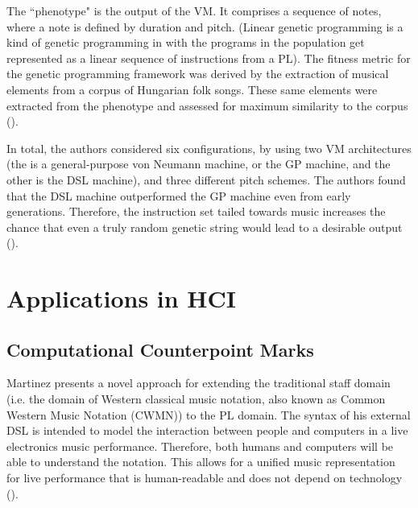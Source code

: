 \documentclass{report}
\newcommand\citeparen[1]{(\cite{#1})}
\begin{document}
The ``phenotype" is the  output of the  VM. It comprises a sequence of  notes,  where a note  is defined by duration and pitch. (Linear genetic programming is a kind of genetic programming in  with the programs in the population get represented  as a linear sequence of instructions from a PL). The fitness metric for the  genetic programming framework was derived  by  the extraction of  musical elements from a corpus of Hungarian folk songs. These same  elements  were extracted from  the  phenotype and  assessed for maximum similarity  to the  corpus \citeparen{sulyok_harte_bodo_2019}.

In total, the authors considered six configurations, by using two VM  architectures (the  is a general-purpose von  Neumann  machine,  or the GP machine,  and the other is  the DSL machine), and  three  different pitch schemes. The authors  found that  the DSL  machine outperformed  the GP machine even from  early generations. Therefore, the instruction set  tailed towards  music increases the  chance  that even a truly random genetic string  would  lead  to a desirable output \citeparen{sulyok_harte_bodo_2019}.

\section{Applications in HCI} 
\label{sec:hci}

\subsection{Computational  Counterpoint Marks}  
\label{subsec:comp_counterpt_marks}
Martinez presents a novel approach  for extending the traditional staff domain (i.e. the domain of Western classical  music notation, also  known  as Common Western Music Notation (CWMN)) to  the PL domain. The syntax  of his external DSL is intended to  model the interaction between people and computers in a live electronics music performance. Therefore, both humans and computers  will be able to understand the notation.  This  allows for a unified music representation for live performance that is  human-readable and does not  depend  on technology \citeparen{martinez_2021}.
\end{document}
